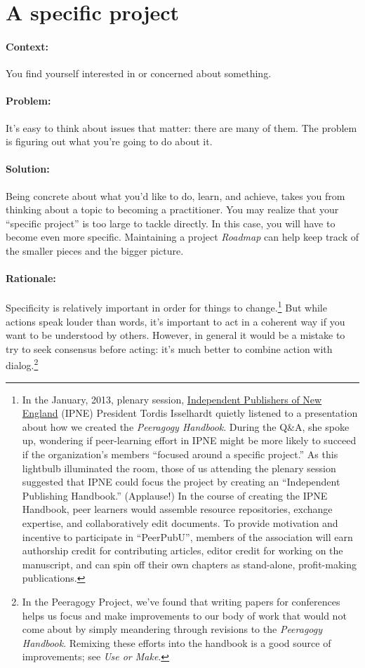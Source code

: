 \section{A specific project}
\paragraph{Context:}
You find yourself interested in or concerned about something.

\paragraph{Problem:}
It's easy to think about issues that matter: there are many of them. The problem is figuring out what you're going to do about it.

\paragraph{Solution:} 
Being concrete about what you'd like to do, learn, and achieve, takes you from thinking about a topic to becoming a practitioner.  You may realize that your ``specific project'' is too large to tackle directly. In this case, you will have to become even more specific.  Maintaining a project \emph{Roadmap} can help keep track of the smaller pieces and the bigger picture.

\paragraph{Rationale:} 
Specificity is relatively important in order for things to change.\footnote{In the January, 2013, plenary
session, \href{http://ipne.org}{Independent Publishers of New England}
(IPNE) President Tordis Isselhardt quietly listened to a presentation
about how we created the \emph{Peeragogy Handbook}. During the Q\&A, she
spoke up, wondering if peer-learning effort in IPNE might be more likely
to succeed if the organization's members ``focused around a specific
project.'' As this lightbulb illuminated the room, those of us attending
the plenary session suggested that IPNE could focus the project by
creating an ``Independent Publishing Handbook.'' (Applause!) In the
course of creating the IPNE Handbook, peer learners would assemble
resource repositories, exchange expertise, and collaboratively edit
documents. To provide motivation and incentive to participate in
``PeerPubU'', members of the association will earn authorship credit for
contributing articles, editor credit for working on the manuscript, and
can spin off their own chapters as stand-alone, profit-making
publications.} But while actions speak louder than words, it's important
to act in a coherent way if you want to be understood by others.  However, in
general it would be a mistake to try to seek consensus before acting: it's much better to combine action with dialog.\footnote{In the Peeragogy Project, we've found that writing papers for conferences helps us focus and make improvements to our body of work that would not come about by simply meandering through revisions to the \emph{Peeragogy Handbook}.  Remixing these efforts into the handbook is a good source of improvements; see \emph{Use or Make}.}

